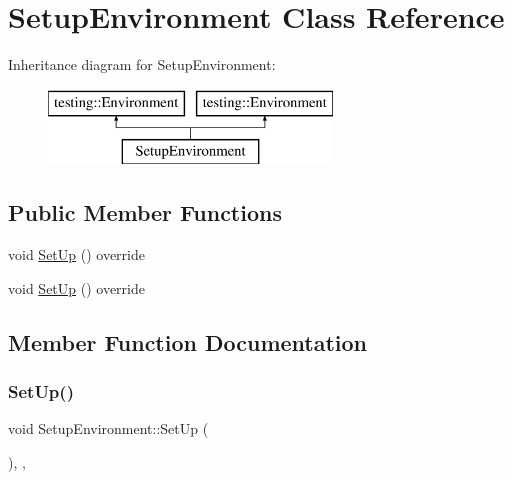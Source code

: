\hypertarget{class_setup_environment}{}\section{Setup\+Environment Class Reference}
\label{class_setup_environment}
Inheritance diagram for Setup\+Environment\+:\begin{figure}[H]
\begin{center}
\leavevmode
\includegraphics[height=2.000000cm]{dd/d2f/class_setup_environment}
\end{center}
\end{figure}
\subsection*{Public Member Functions}
\begin{DoxyCompactItemize}
\item 
void \mbox{\hyperlink{class_setup_environment_a02995e3c2581a49c9dd0526d80072b38}{Set\+Up}} () override
\item 
void \mbox{\hyperlink{class_setup_environment_a02995e3c2581a49c9dd0526d80072b38}{Set\+Up}} () override
\end{DoxyCompactItemize}


\subsection{Member Function Documentation}
\mbox{\label{class_setup_environment_a02995e3c2581a49c9dd0526d80072b38}} 
\subsubsection{\texorpdfstring{SetUp()}{SetUp()}\hspace{0.1cm}{\footnotesize\ttfamily [1/2]}}
{\footnotesize\ttfamily void Setup\+Environment\+::\+Set\+Up (\begin{DoxyParamCaption}{ }\end{DoxyParamCaption})\hspace{0.3cm}{\ttfamily [inline]}, {\ttfamily [override]}, {\ttfamily [virtual]}}



